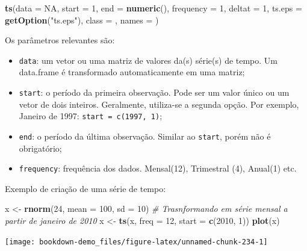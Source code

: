 \documentclass[]{book}
\newenvironment{Shaded}{\begin{snugshade}}{\end{snugshade}}
\newcommand{\KeywordTok}[1]{\textcolor[rgb]{0.13,0.29,0.53}{\textbf{#1}}}
\newcommand{\DataTypeTok}[1]{\textcolor[rgb]{0.13,0.29,0.53}{#1}}
\newcommand{\DecValTok}[1]{\textcolor[rgb]{0.00,0.00,0.81}{#1}}
\newcommand{\StringTok}[1]{\textcolor[rgb]{0.31,0.60,0.02}{#1}}
\newcommand{\CommentTok}[1]{\textcolor[rgb]{0.56,0.35,0.01}{\textit{#1}}}
\newcommand{\OtherTok}[1]{\textcolor[rgb]{0.56,0.35,0.01}{#1}}
\newcommand{\NormalTok}[1]{#1}
\providecommand{\tightlist}{%
  \setlength{\itemsep}{0pt}\setlength{\parskip}{0pt}}
\begin{document}
\begin{Shaded}
\begin{Highlighting}[]
\KeywordTok{ts}\NormalTok{(}\DataTypeTok{data =} \OtherTok{NA}\NormalTok{, }\DataTypeTok{start =} \DecValTok{1}\NormalTok{, }\DataTypeTok{end =} \KeywordTok{numeric}\NormalTok{(), }\DataTypeTok{frequency =} \DecValTok{1}\NormalTok{,}
   \DataTypeTok{deltat =} \DecValTok{1}\NormalTok{, }\DataTypeTok{ts.eps =} \KeywordTok{getOption}\NormalTok{(}\StringTok{"ts.eps"}\NormalTok{), }\DataTypeTok{class =}\NormalTok{ , }\DataTypeTok{names =}\NormalTok{ )}
\end{Highlighting}
\end{Shaded}

Os parâmetros relevantes são:

\begin{itemize}
\tightlist
\item
  \texttt{data}: um vetor ou uma matriz de valores da(s) série(s) de
  tempo. Um data.frame é transformado automaticamente em uma matriz;
\item
  \texttt{start}: o período da primeira observação. Pode ser um valor
  único ou um vetor de dois inteiros. Geralmente, utiliza-se a segunda
  opção. Por exemplo, Janeiro de 1997: \texttt{start\ =\ c(1997,\ 1)};
\item
  \texttt{end}: o período da última observação. Similar ao
  \texttt{start}, porém não é obrigatório;
\item
  \texttt{frequency}: frequência dos dados. Mensal(12), Trimestral (4),
  Anual(1) etc.
\end{itemize}

Exemplo de criação de uma série de tempo:

\begin{Shaded}
\begin{Highlighting}[]
\NormalTok{x <-}\StringTok{ }\KeywordTok{rnorm}\NormalTok{(}\DecValTok{24}\NormalTok{, }\DataTypeTok{mean =} \DecValTok{100}\NormalTok{, }\DataTypeTok{sd =} \DecValTok{10}\NormalTok{)}
\CommentTok{# Trasnformando em série mensal a partir de janeiro de 2010}
\NormalTok{x <-}\StringTok{ }\KeywordTok{ts}\NormalTok{(x, }\DataTypeTok{freq =} \DecValTok{12}\NormalTok{, }\DataTypeTok{start =} \KeywordTok{c}\NormalTok{(}\DecValTok{2010}\NormalTok{, }\DecValTok{1}\NormalTok{))}
\KeywordTok{plot}\NormalTok{(x)}
\end{Highlighting}
\end{Shaded}

\begin{center}\texttt{[image: bookdown-demo\_files/figure-latex/unnamed-chunk-234-1]} \end{center}
\end{document}
